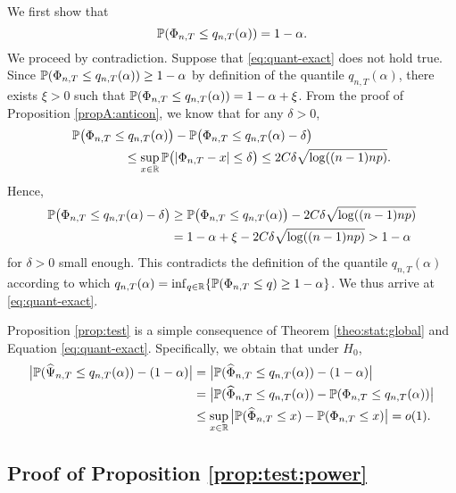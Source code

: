 We first show that 
\begin{equation}\label{eq:quant-exact}
\mathbb{P}(\Phi_{n,T} \le q_{n,T}(\alpha)) = 1 - \alpha. 
\end{equation}
We proceed by contradiction. Suppose that \eqref{eq:quant-exact} does not hold true. Since $\mathbb{P}(\Phi_{n,T} \le q_{n,T}(\alpha)) \ge 1 - \alpha$ by definition of the quantile $q_{n,T}(\alpha)$, there exists $\xi > 0$ such that $\mathbb{P}(\Phi_{n,T} \le q_{n,T}(\alpha)) = 1-\alpha + \xi$. From the proof of Proposition \ref{propA:anticon}, we know that for any $\delta > 0$, 
\begin{align*}
\mathbb{P} \big(\Phi_{n,T} & \le q_{n,T}(\alpha)\big) - \mathbb{P}\big(\Phi_{n,T} \le q_{n,T}(\alpha) - \delta\big) \\
 & \quad \le \sup_{x \in \mathbb{R}} \mathbb{P} \big(|\Phi_{n,T} - x| \le \delta \big)  \le 2 C \delta \sqrt{\log((n-1)np)}. 
\end{align*}
Hence, 
\begin{align*}
\mathbb{P} \big(\Phi_{n,T} \le q_{n,T}(\alpha) - \delta \big) 
 & \ge \mathbb{P}\big(\Phi_{n,T} \le q_{n,T}(\alpha) \big) - 2 C \delta \sqrt{\log((n-1)np)} \\
 & = 1-\alpha + \xi - 2 C \delta \sqrt{\log((n-1)np)} > 1-\alpha
\end{align*}
for $\delta > 0$ small enough. This contradicts the definition of the quantile $q_{n,T}(\alpha)$ according to which $q_{n,T}(\alpha) = \inf_{q \in \mathbb{R}} \{ \mathbb{P}(\Phi_{n,T} \le q) \ge 1-\alpha \}$. We thus arrive at \eqref{eq:quant-exact}. 


Proposition \ref{prop:test} is a simple consequence of Theorem \ref{theo:stat:global} and Equation \eqref{eq:quant-exact}. Specifically, we obtain that under $H_0$, 
\begin{align*}
\big| \mathbb{P}(\widehat{\Psi}_{n, T} \le q_{n,T}(\alpha)) - (1-\alpha) \big| 
 & = \big| \mathbb{P}(\widehat{\Phi}_{n, T} \le q_{n,T}(\alpha)) - (1-\alpha) \big| \\
 & = \big| \mathbb{P}(\widehat{\Phi}_{n, T} \le q_{n,T}(\alpha)) - \mathbb{P}(\Phi_{n,T} \le q_{n,T}(\alpha)) \big| \\
 & \le \sup_{x \in \mathbb{R}} \big| \mathbb{P}(\widehat{\Phi}_{n, T} \le x) - \mathbb{P}(\Phi_{n,T} \le x) \big| = o(1). 
\end{align*}



\subsection*{Proof of Proposition \ref{prop:test:power}}%


